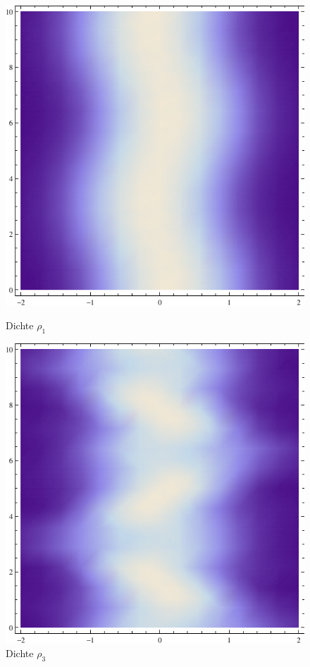 \begin{figure}
\begin{minipage}[t]{0.3\linewidth}
		\includegraphics[width=\textwidth]{H3-1.pdf}
		\caption{Dichte $\rho_1$}
		\label{fig:1}
	\end{minipage}
	\hfill
	\begin{minipage}[t]{0.3\linewidth}
		\includegraphics[width=\textwidth]{H3-3.pdf}
		\caption{Dichte $\rho_3$}
		\label{fig:3}
	\end{minipage}
\end{figure}

